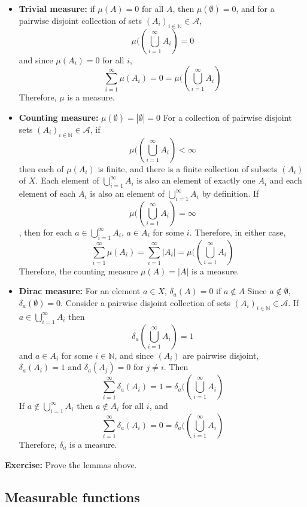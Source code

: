 \documentclass{article}
\begin{document}
\begin{itemize}
	\item \textbf{Trivial measure:} if $\mu(A)=0$ for all $A$, then 
		$\mu(\emptyset)=0$, and for a pairwise disjoint collection of
		sets $(A_i)_{i \in \mathbb{N}} \in \mathcal{A}$, 
		\[ \mu(\left( \bigcup_{i =1}^{\infty} A_i \right) = 0 \]
		and since $\mu \left( A_i \right) = 0$ for all $i$,
		\[ \sum_{i=1}^{\infty} \mu \left( A_i \right) = 0 = 
		\mu(\left( \bigcup_{i=1}^{\infty} A_i \right) \]
		Therefore, $\mu$ is a measure.
	\item \textbf{Counting measure:} $\mu(\emptyset) = |\emptyset|=0$
		For a collection of pairwise disjoint sets 
		$(A_i)_{i \in \mathbb{N}} \in \mathcal{A}$, if 
		\[ \mu(\left( \bigcup_{i =1}^{\infty} A_i \right) < \infty \]
		then each of $\mu(A_i)$ is finite, and there is a finite
		collection of subsets $(A_i)$ of $X$. Each element of 
		$\bigcup_{i =1}^{\infty} A_i$ is also an element of exactly one $A_i$
		and each element of each $A_i$ is also an element of 
		$\bigcup_{i =1}^{\infty} A_i$ by definition.
		If \[ \mu(\left( \bigcup_{i =1}^{\infty} A_i \right) = \infty \], then 
		for each $a \in \bigcup_{i =1}^{\infty} A_i$, $a \in A_i$ for some $i$.
		Therefore, in either case,
		\[ \sum_{i=1}^{\infty} \mu \left( A_i \right) = 
		\sum_{i=1}^{\infty} |A_i| = 
		\mu(\left( \bigcup_{i =1}^{\infty} A_i \right) \]
		Therefore, the counting measure $\mu(A)=|A|$ is a measure.
	\item \textbf{Dirac measure:} For an element $a \in X$, $\delta_a(A)=0$
		if $a \notin A$
		Since $a \notin \emptyset$, $\delta_a(\emptyset) = 0$.
		Consider a pairwise disjoint collection of sets 
		$(A_i)_{i \in \mathbb{N}} \in \mathcal{A}$. If 
		$a \in \bigcup_{i =1}^{\infty} A_i $ then
		\[\delta_a \left(\bigcup_{i=1}^{\infty} A_i \right) = 1 \]
		and $a \in A_i$ for some $i \in \mathbb{N}$, and since 
		$(A_i)$ are pairwise disjoint, $\delta_a(A_i)=1$ and
		$\delta_a(A_j)=0$ for $j \ne i$. Then
		\[ \sum_{i=1}^{\infty} \delta_a \left( A_i \right) = 1 = 
                \delta_a(\left( \bigcup_{i=1}^{\infty} A_i \right) \]
		If $a \notin \bigcup_{i =1}^{\infty} A_i $ then
		$a \notin A_i$ for all $i$, and
		\[ \sum_{i=1}^{\infty} \delta_a \left( A_i \right) = 0 =
                \delta_a(\left( \bigcup_{i=1}^{\infty} A_i \right) \]
		Therefore, $\delta_a$ is a measure.
\end{itemize}

\textbf{Exercise:} Prove the lemmas above.

\subsection{Measurable functions}
\end{document}

